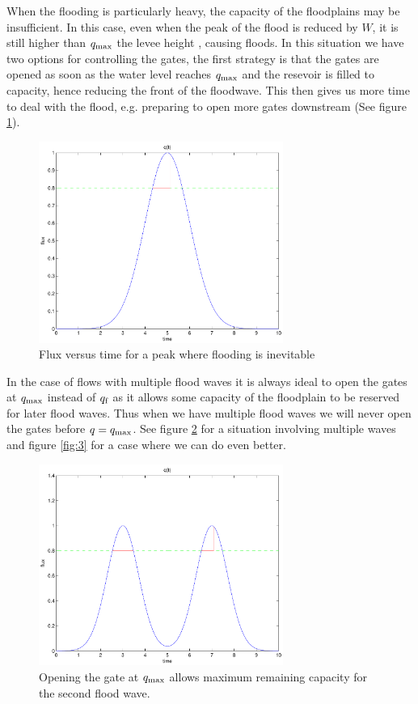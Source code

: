 When the flooding is particularly heavy, the capacity of the floodplains may be insufficient. In this case, even when the peak of the flood is reduced by $W$, it is still higher than $q_{\mbox{\scriptsize max}}$ the levee height , causing floods. In this situation we have two options for controlling the gates, the first strategy is that the gates are opened as soon as the water level reaches $q_{\mbox{\scriptsize max}}$ and the resevoir is filled to capacity, hence reducing the front of the floodwave. This then gives us more time to deal with the flood, e.g. preparing to open more gates downstream (See figure \ref{fig:1}). 
\begin{figure}
\begin{center}
\includegraphics[width=8cm]{fig1}		
\end{center}
\caption{Flux versus time for a peak where flooding is inevitable}
\label{fig:1}
\end{figure}

In the case of flows with multiple flood waves it is always ideal to open the gates at $q_{\mbox{\scriptsize max}}$ instead of $q_{\mbox{\scriptsize f}}$ as it allows some capacity of the floodplain to be reserved for later flood waves. Thus when we have multiple flood waves we will never open the gates before $q = q_{\mbox{\scriptsize max}}$.  
See figure \ref{fig:2} for a situation involving multiple waves and
figure \ref{fig:3} for a case where we can do even better.

\begin{figure}
\begin{center}
\includegraphics[width=8cm]{fig2}
\end{center}
\caption{Opening the gate at $q_{\mbox{\scriptsize max}}$ allows maximum remaining capacity for the second flood wave.}
\label{fig:2}
\end{figure}



